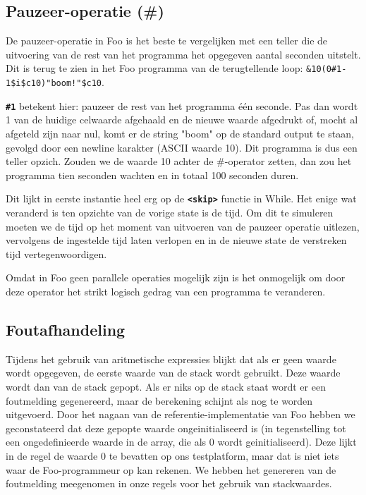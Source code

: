 \documentclass[11pt]{article}
\begin{document}
\subsection{Pauzeer-operatie (\#)}
De pauzeer-operatie in Foo is het beste te vergelijken met een teller die de uitvoering van de rest van het programma het opgegeven aantal seconden uitstelt. 
Dit is terug te zien in het Foo programma van de terugtellende loop: \verb|&10(0#1-1$i$c10)"boom!"$c10|.

{\bf \verb|#1|} betekent hier: pauzeer de rest van het programma \'e\'en seconde. 
Pas dan wordt 1 van de huidige celwaarde afgehaald en de nieuwe waarde afgedrukt of, mocht al afgeteld zijn naar nul, komt er de string "boom" op de standard output te staan, gevolgd door een newline karakter (ASCII waarde 10).
Dit programma is dus een teller opzich.
Zouden we de waarde 10 achter de \#-operator zetten, dan zou het programma tien seconden wachten en in totaal 100 seconden duren.


Dit lijkt in eerste instantie heel erg op de {\bf\verb|<skip>|} functie in While.
Het enige wat veranderd is ten opzichte van de vorige state is de tijd.
Om dit te simuleren moeten we de tijd op het moment van uitvoeren van de pauzeer operatie uitlezen, vervolgens de ingestelde tijd laten verlopen en in de nieuwe state de verstreken tijd vertegenwoordigen.

Omdat in Foo geen parallele operaties mogelijk zijn is het onmogelijk om door deze operator het strikt logisch gedrag van een programma te veranderen.

\subsection{Foutafhandeling} %

Tijdens het gebruik van aritmetische expressies blijkt dat als er geen waarde wordt opgegeven, de eerste waarde van de stack wordt gebruikt. 
Deze waarde wordt dan van de stack gepopt. 
Als er niks op de stack staat wordt er een foutmelding gegenereerd, maar de berekening schijnt als nog te worden uitgevoerd.
Door het nagaan van de referentie-implementatie van Foo hebben we geconstateerd dat deze gepopte waarde ongeinitialiseerd is (in tegenstelling tot een ongedefinieerde waarde in de array, die als 0 wordt geinitialiseerd).
Deze lijkt in de regel de waarde 0 te bevatten op ons testplatform, maar dat is niet iets waar de Foo-programmeur op kan rekenen.
We hebben het genereren van de foutmelding meegenomen in onze regels voor het gebruik van stackwaardes.
\end{document}
